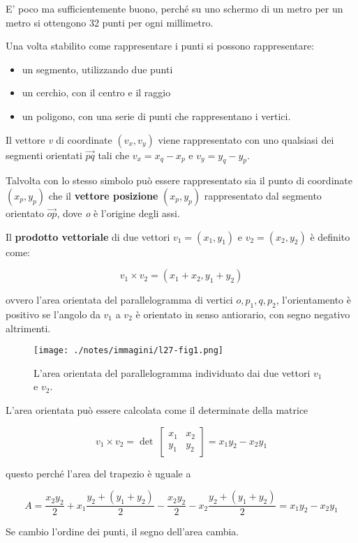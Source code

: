 E' poco ma sufficientemente buono, perché su uno schermo di un metro per un metro si ottengono 32 punti per ogni millimetro.

Una volta stabilito come rappresentare i punti si possono rappresentare:

\begin{itemize}
\item   un segmento, utilizzando due punti
\item   un cerchio, con il centro e il raggio
\item   un poligono, con una serie di punti che rappresentano i vertici.
\end{itemize}

Il vettore \emph{v} di coordinate $(v_x, v_y)$ viene rappresentato con uno qualsiasi dei segmenti orientati $\overrightarrow{pq}$ tali
che $v_x = x_q-x_p$ e $v_y = y_q - y_p$.

Talvolta con lo stesso simbolo può essere rappresentato sia il punto di coordinate $(x_p,y_p)$ che il \textbf{vettore posizione} $(x_p,y_p)$ rappresentato dal segmento orientato $\overrightarrow{op}$, dove \textit{o} è l'origine degli assi.

Il \textbf{prodotto vettoriale} di due vettori $v_1 = (x_1,y_1)$ e $v_2 = (x_2,y_2)$ è definito come:

$$
v_1 \times v_2 = (x_1+x_2, y_1+y_2)
$$

ovvero l'area orientata del parallelogramma di vertici $o, p_1, q,p_2$, l'orientamento è positivo se l'angolo da $v_1$ a $v_2$ è orientato in
senso antiorario, con segno negativo altrimenti.

\begin{figure}
	\centering
	\texttt{[image: ./notes/immagini/l27-fig1.png]}
	\caption{L'area orientata del parallelogramma individuato dai due vettori $v_1$ e $v_2$.}
\end{figure}

L'area orientata può essere calcolata come il determinate della matrice

$$
v_1 \times v_2 = \det \: \begin{bmatrix}
x_1 & x_2 \\
y_1 & y_2
\end{bmatrix} = x_1 y_2 - x_2 y_1
$$

questo perché l'area del trapezio è uguale a

$$
A = \frac{x_2y_2}{2} + x_1\frac{y_2+(y_1+y_2)}{2} - \frac{x_2y_2}{2} - x_2\frac{y_2+ (y_1+y_2)}{2} = x_1y_2 - x_2y_1
$$

Se cambio l'ordine dei punti, il segno dell'area cambia.
